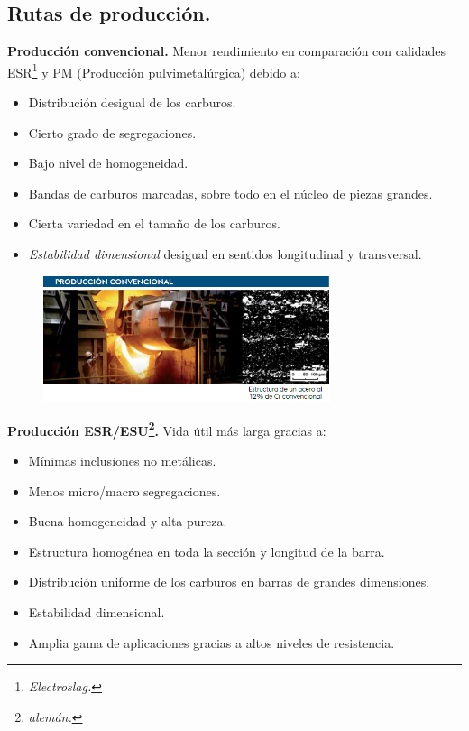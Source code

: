 \documentclass[12pt,a4paper]{article}
\begin{document}
\subsection{Rutas de producción.}
\textbf{Producción convencional.} Menor rendimiento en comparación con calidades ESR\footnote{\textit{Electroslag.}} y PM (Producción pulvimetalúrgica) debido a:
\begin{itemize}
    \item Distribución desigual de los carburos.
    \item Cierto grado de segregaciones.
    \item Bajo nivel de homogeneidad.
    \item Bandas de carburos marcadas, sobre todo en el núcleo de piezas grandes.
    \item Cierta variedad en el tamaño de los carburos.
    \item \textit{Estabilidad dimensional} desigual en sentidos longitudinal y transversal.
\end{itemize}
\begin{figure}[H]    
    \centering         
    \includegraphics[width=0.75\textwidth]{Inagenes para latex/7.png}
\end{figure}
\textbf{Producción ESR/ESU\footnote{\textit{alemán.}}.} Vida útil más larga gracias a:
\begin{itemize}
    \item Mínimas inclusiones no metálicas.
    \item Menos micro/macro segregaciones.
    \item Buena homogeneidad y alta pureza.
    \item Estructura homogénea en toda la sección y longitud de la barra.
    \item Distribución uniforme de los carburos en barras de grandes dimensiones.
    \item Estabilidad dimensional.
    \item Amplia gama de aplicaciones gracias a altos niveles de resistencia.
\end{itemize}
\end{document}
